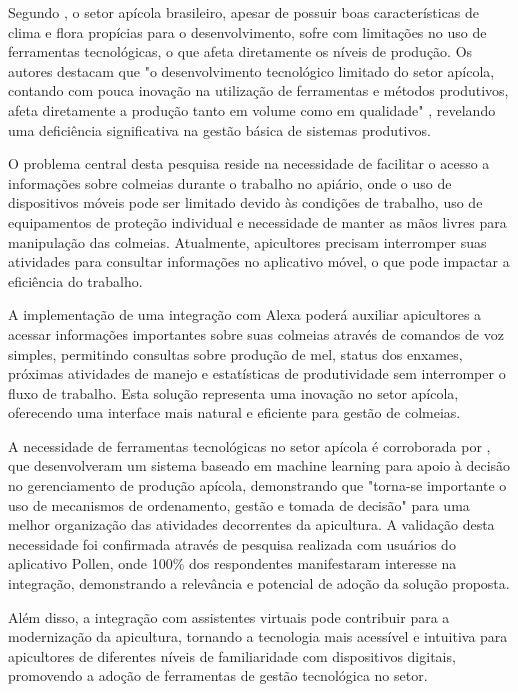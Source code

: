 Segundo \textcite{silva2021}, o setor apícola brasileiro, apesar de possuir boas características de clima e flora propícias para o desenvolvimento, 
sofre com limitações no uso de ferramentas tecnológicas, o que afeta diretamente os níveis de produção. Os autores destacam que 
"o desenvolvimento tecnológico limitado do setor apícola, contando com pouca inovação na utilização de ferramentas e métodos produtivos, 
afeta diretamente a produção tanto em volume como em qualidade" \cite[p. 10]{silva2021}, revelando uma deficiência significativa na gestão básica de sistemas produtivos.

O problema central desta pesquisa reside na necessidade de facilitar o acesso a informações sobre colmeias durante o trabalho no apiário, 
onde o uso de dispositivos móveis pode ser limitado devido às condições de trabalho, uso de equipamentos de proteção individual 
e necessidade de manter as mãos livres para manipulação das colmeias. Atualmente, apicultores precisam interromper suas atividades 
para consultar informações no aplicativo móvel, o que pode impactar a eficiência do trabalho.

A implementação de uma integração com Alexa poderá auxiliar apicultores a acessar informações importantes sobre suas colmeias 
através de comandos de voz simples, permitindo consultas sobre produção de mel, status dos enxames, próximas atividades de manejo 
e estatísticas de produtividade sem interromper o fluxo de trabalho. Esta solução representa uma inovação no setor apícola, 
oferecendo uma interface mais natural e eficiente para gestão de colmeias. 

A necessidade de ferramentas tecnológicas no setor apícola é corroborada por \textcite{silva2021}, que desenvolveram um sistema baseado em 
machine learning para apoio à decisão no gerenciamento de produção apícola, demonstrando que "torna-se importante o uso de mecanismos de 
ordenamento, gestão e tomada de decisão" \cite[p. 15]{silva2021} para uma melhor organização das atividades decorrentes da apicultura. A validação desta necessidade 
foi confirmada através de pesquisa realizada com usuários do aplicativo Pollen, onde 100\% dos respondentes manifestaram interesse na integração, 
demonstrando a relevância e potencial de adoção da solução proposta.

Além disso, a integração com assistentes virtuais pode contribuir para a modernização da apicultura, 
tornando a tecnologia mais acessível e intuitiva para apicultores de diferentes níveis de familiaridade com dispositivos digitais, 
promovendo a adoção de ferramentas de gestão tecnológica no setor.



